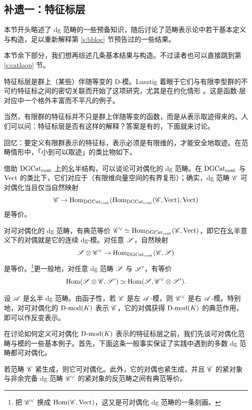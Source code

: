 \subsection{补遗一：特征标层}

\label{ss:charsheaves}
\ssszh 本节开头略述了 dg 范畴的一些预备知识，随后讨论了范畴表示论中若干基本定义与构造，足以重新解释第 \ref{s:bbloc} 节预告过的一些结果。

本节余下部分，我们想再综述几条基本结果与构造。不过读者也可以直接跳到第 \ref{s:catloop} 节。

\ssszh 特征标层是群上（某些）伴随等变的 D-模。Lusztig 着眼于它们与有限李型群的不可约特征标之间的密切关联而开始了这项研究，尤其是在约化情形 \cite{luschar1, luschar23, luschar4, luschar5}。这是函数-层对应中一个格外丰富而不平凡的例子。

当然，有限群的特征标并不只是群上伴随等变的函数，而是从表示取迹得来的。人们可以问：特征标层是否有这样的解释？答案是有的，下面就来讨论。

\ssszh[对偶性] \label{ss:dualizable}回忆：要定义有限群表示的特征标，表示必须是有限维的，才能安全地取迹。在范畴情形中，「小到可以取迹」的类比物如下。

借助 $\DGCat$ 上的幺半结构，可以谈论可对偶化的 dg 范畴。在 $\DGCat$ 与 $\Vect$ 的类比下，它们对应于（有限维向量空间的有界复形）；确实，dg 范畴 $\sC$ 可对偶化当且仅当自然映射
%
\[
     \sC \rightarrow \udHom( \udHom(\sC, \Vect), \Vect)
\]
%
是等价。

对可对偶化的 dg 范畴，有典范等价 $\sC^\vee \simeq \udHom(\sC,
\Vect)$，即它在幺半意义下的对偶就是它的连续 dg-模。对任意 $\sS$，自然映射
%
\[
    \sS \otimes \sC^\vee \rightarrow \udHom(\sC, \sS)
\]
%
是等价。\footnote{把 $\sC^\vee$ 换成 $\Hom(\sC, \Vect)$，这又是可对偶化 dg 范畴的一条刻画。}更一般地，对任意 dg 范畴 $\sS$ 与 $\sS'$，有等价
%
\[
\Hom( \sS \otimes \sC, \sS') \simeq \Hom( \sS, \sC^\vee \otimes \sS').
\]
%

设 $\sA$ 是幺半 dg 范畴。由函子性，若 $\sC$ 是左 $\sA$-模，则 $\sC^\vee$ 是右 $\sA$-模。特别地，对可对偶化的 $\Dmod(K)$ 表示 $\sC$，它的对偶获得 $\Dmod(K)$ 的典范作用，即可以作反变表示。

在讨论如何定义可对偶化 $\Dmod(K)$ 表示的特征标层之前，我们先谈可对偶化范畴与模的一些基本例子。首先，下面这条一般事实保证了实践中遇到的多数 dg 范畴都可对偶化。

\begin{ex}若范畴 $\sC$ 紧生成，则它可对偶化。此外，它的对偶也紧生成，并且 $\sC$ 的紧对象与非余完备 dg 范畴 $\sC^\vee$ 的紧对象的反范畴之间有典范等价。
\end{ex}

